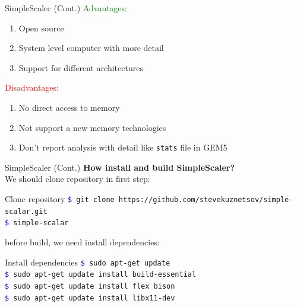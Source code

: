 \documentclass{beamer}
\begin{document}
\begin{frame}{SimpleScaler (Cont.)}
	\textcolor{green}{Advantages:}
	\begin{enumerate}
		\item Open source
		\item System level computer with more detail
		\item Support for different architectures
	\end{enumerate}
	
	\textcolor{red}{Disadvantages:}
	\begin{enumerate}
		\item No direct access to memory
		\item Not support a new memory technologies
		\item Don't report analysis with detail like \texttt{stats} file in GEM5
	\end{enumerate}
	
\end{frame}





\begin{frame}{SimpleScaler (Cont.)}
	\textbf{How install and build SimpleScaler?}\\
	We should clone repository in first step:
	\begin{block}{Clone repository}
		\texttt{\textcolor{blue}{\$} git clone ‫‪https://github.com/stevekuznetsov/simple-scalar.git‬‬‬‬} \\
		\texttt{\textcolor{blue}{\$} ‫‪‫‪simple-scalar‬‬} \\
	\end{block}
	
	before build, we need install dependencies:
	\begin{block}{Install dependencies}
		\texttt{\textcolor{blue}{\$} sudo apt-get update‬‬} \\
		\texttt{\textcolor{blue}{\$} sudo apt-get update install build-‫‪essential‬‬‬‬} \\
		\texttt{\textcolor{blue}{\$} ‫‪sudo apt-get update install flex bison‬‬} \\
		\texttt{\textcolor{blue}{\$} ‫‪sudo apt-get update install libx11-dev‬‬} \\
	\end{block}
\end{frame}
\end{document}
